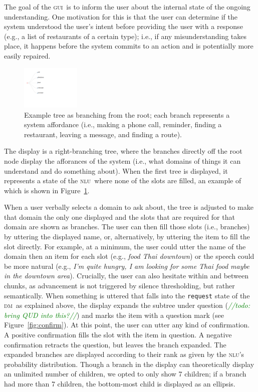 \documentclass[11pt]{article}
\newcommand{\todo}[1]{\textcolor{green}{\emph{//todo: #1//}}}
\newcommand{\nlu}[0]{\textsc{nlu}}
\newcommand{\dm}[0]{\textsc{dm}}
\newcommand{\ui}[0]{\textsc{gui}}
\begin{document}
The goal of the \ui\ is to inform the user about the internal state of the ongoing understanding. One motivation for this is that the user can determine if the system understood the user's intent before providing the user with a response (e.g., a list of restaurants of a certain type); i.e., if any misunderstanding takes place, it happens before the system commits to an action and is potentially more easily repaired. 

\begin{figure}
  \centering
      \includegraphics[width=0.25\textwidth]{figures/diatree-affordances.pdf}	
      \caption{Example tree as branching from the root; each branch represents a system affordance (i.e., making a phone call, reminder, finding a restaurant, leaving a message, and finding a route). \label{fig:affordances}}
\end{figure}

The display is a right-branching tree, where the branches directly off the root node display the afforances of the system (i.e., what domains of things it can understand and do something about). When the first tree is displayed, it represents a state of the \nlu\ where none of the slots are filled, an example of which is shown in Figure~\ref{fig:affordances}. 

When a user verbally selects a domain to ask about, the tree is adjusted to make that domain the only one displayed and the slots that are required for that domain are shown as branches. The user can then fill those slots (i.e., branches) by uttering the displayed name, or, alternatively, by uttering the item to fill the slot directly. For example, at a minimum, the user could utter the name of the domain then an item for each slot (e.g.,  \emph{food Thai downtown}) or the speech could be more natural (e.g., \emph{I'm quite hungry, I am looking for some Thai food maybe in the downtown area}). Crucially, the user can also hesitate within and between chunks, as advancement is not triggered by silence thresholding, but rather semantically.
When something is uttered that falls into the \texttt{request} state of the \dm\ as explained above, the display expands the subtree under question (\todo{bring QUD into this?}) and marks the item with a question mark (see Figure~\ref{fig:confirm}). At this point, the user can utter any kind of confirmation. A positive confirmation fills the slot with the item in question. A negative confirmation retracts the question, but leaves the branch expanded. The expanded branches are displayed according to their rank as given by the \nlu's probability distribution. Though a branch in the display can theoretically display an unlimited number of children, we opted to only show 7 children; if a branch had more than 7 children, the bottom-most child is displayed as an ellipsis. 
\end{document}
